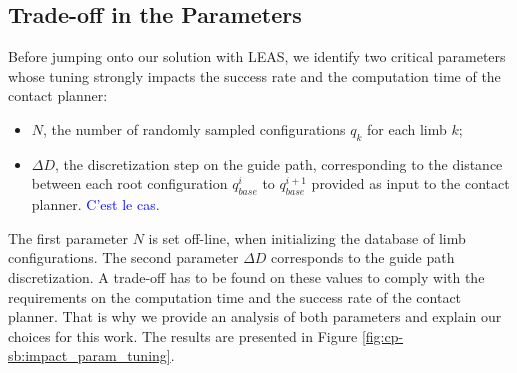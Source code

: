 \subsection{Trade-off in the Parameters \label{subsub:cp-sb:tradeoff}}

Before jumping onto our solution with LEAS, we identify two critical parameters whose tuning strongly impacts the success rate and the computation time of the contact planner:
\begin{itemize}
    \item $N$, the number of randomly sampled configurations $q_k$ for each limb $k$;
    \item $\Delta D$, the discretization step on the guide path, corresponding to the distance between each root configuration $q_{base}^i$ to $q_{base}^{i+1}$ provided as input to the contact planner. 
     \textcolor{blue}{C'est le cas.}
\end{itemize}
The first parameter $N$ is set off-line, when initializing the database of limb configurations. The second parameter $\Delta D$ corresponds to the guide path discretization. 
A trade-off has to be found on these values to comply with the requirements on the computation time and the success rate of the contact planner.%
That is why we provide an analysis of both parameters and explain our choices for this work. The results are presented in Figure \ref{fig:cp-sb:impact_param_tuning}.

